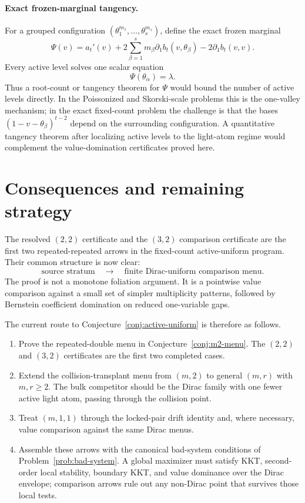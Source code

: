 \documentclass[11pt]{article}
\theoremstyle{definition}
\begin{document}
\paragraph{Exact frozen-marginal tangency.}
For a grouped configuration
$(\theta_1^{m_1},\ldots,\theta_s^{m_s})$, define the exact frozen marginal
\[
  \Psi(v)=a_t'(v)+2\sum_{\beta=1}^s m_\beta\partial_1 b_t(v,\theta_\beta)
          -2\partial_1b_t(v,v).
\]
Every active level solves one scalar equation
\[
  \Psi(\theta_\alpha)=\lambda.
\]
Thus a root-count or tangency theorem for $\Psi$ would bound the number of
active levels directly.  In the Poissonized and Skorski-scale problems this
is the one-valley mechanism; in the exact fixed-count problem the challenge
is that the bases $(1-v-\theta_\beta)^{t-2}$ depend on the surrounding
configuration.  A quantitative tangency theorem after localizing active
levels to the light-atom regime would complement the value-domination
certificates proved here.


\section{Consequences and remaining strategy}\label{sec:remaining-strategy}

The resolved $(2,2)$ certificate and the $(3,2)$ comparison certificate are
the first two repeated-repeated arrows in the fixed-count active-uniform
program.  Their common structure is now clear:
\[
  \text{source stratum}
  \quad\longrightarrow\quad
  \text{finite Dirac-uniform comparison menu}.
\]
The proof is not a monotone foliation argument.  It is a pointwise value
comparison against a small set of simpler multiplicity patterns, followed by
Bernstein coefficient domination on reduced one-variable gaps.

The current route to Conjecture~\ref{conj:active-uniform} is therefore as
follows.
\begin{enumerate}[label=\textbf{Step \arabic*.}]
\item Prove the repeated-double menu in Conjecture~\ref{conj:m2-menu}.  The
$(2,2)$ and $(3,2)$ certificates are the first two completed cases.
\item Extend the collision-transplant menu from $(m,2)$ to general
$(m,r)$ with $m,r\ge2$.  The bulk competitor should be the Dirac family
with one fewer active light atom, passing through the collision point.
\item Treat $(m,1,1)$ through the locked-pair drift identity and, where
necessary, value comparison against the same Dirac menus.
\item Assemble these arrows with the canonical bad-system conditions of
Problem~\ref{prob:bad-system}.  A global maximizer must satisfy KKT,
second-order local stability, boundary KKT, and value dominance over the
Dirac envelope; comparison arrows rule out any non-Dirac point that survives
those local tests.
\end{enumerate}
\end{document}
